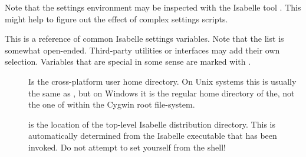 \begin{isabellebody}
\begin{isamarkuptext}
\begin{itemize}
  \end{itemize}

  \medskip Note that the settings environment may be inspected with
  the Isabelle tool \hyperlink{tool.getenv}{\mbox{}}.  This might help to figure out the
  effect of complex settings scripts.%
\end{isamarkuptext}%
\isamarkuptrue%
%
\isamarkuptrue%
%
\begin{isamarkuptext}%
This is a reference of common Isabelle settings variables. Note that
  the list is somewhat open-ended. Third-party utilities or interfaces
  may add their own selection. Variables that are special in some
  sense are marked with .

  \begin{description}

  \item[\hypertarget{setting.USER-HOME}{\hyperlink{setting.USER-HOME}{\mbox{}}}] Is the cross-platform
  user home directory.  On Unix systems this is usually the same as
  \hyperlink{setting.HOME}{\mbox{}}, but on Windows it is the regular home directory of
  the, not the one of within the Cygwin root file-system.

 \item[\hypertarget{setting.ISABELLE-HOME}{\hyperlink{setting.ISABELLE-HOME}{\mbox{}}}] is the location of the
  top-level Isabelle distribution directory. This is automatically
  determined from the Isabelle executable that has been invoked.  Do
  not attempt to set \hyperlink{setting.ISABELLE-HOME}{\mbox{}} yourself from the shell!
  

\end{description}
\end{isamarkuptext}
\end{isabellebody}
